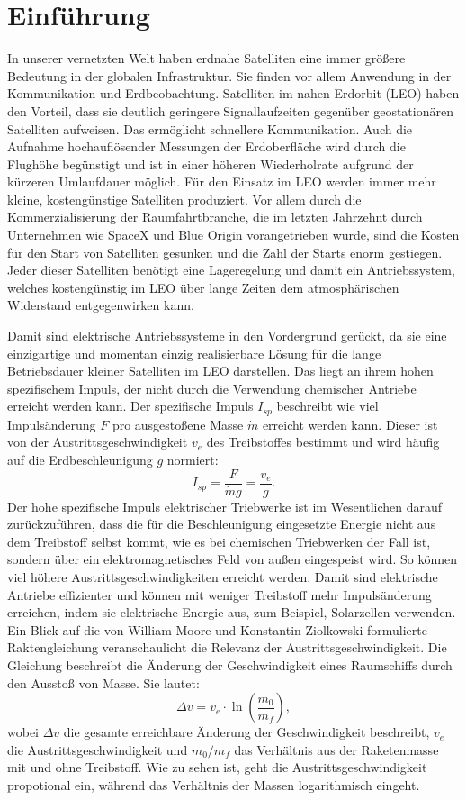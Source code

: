 \chapter{Einführung}
In unserer vernetzten Welt haben erdnahe Satelliten eine immer größere Bedeutung in der globalen Infrastruktur. Sie finden vor allem Anwendung in der Kommunikation und Erdbeobachtung. Satelliten im nahen Erdorbit (LEO) haben den Vorteil, dass sie deutlich geringere Signallaufzeiten gegenüber geostationären Satelliten aufweisen. Das ermöglicht schnellere Kommunikation. Auch die Aufnahme hochauflösender Messungen der Erdoberfläche wird durch die Flughöhe begünstigt und ist in einer höheren Wiederholrate aufgrund der kürzeren Umlaufdauer möglich. Für den Einsatz im LEO werden immer mehr kleine, kostengünstige Satelliten produziert. Vor allem durch die Kommerzialisierung der Raumfahrtbranche, die im letzten Jahrzehnt durch Unternehmen wie SpaceX und Blue Origin vorangetrieben wurde, sind die Kosten für den Start von Satelliten gesunken und die Zahl der Starts enorm gestiegen. Jeder dieser Satelliten benötigt eine Lageregelung und damit ein Antriebssystem, welches kostengünstig im LEO über lange Zeiten dem atmosphärischen Widerstand entgegenwirken kann.

Damit sind elektrische Antriebssysteme in den Vordergrund gerückt, da sie eine einzigartige und momentan einzig realisierbare Lösung für die lange Betriebsdauer kleiner Satelliten im LEO darstellen. Das liegt an ihrem hohen spezifischem Impuls, der nicht durch die Verwendung chemischer Antriebe erreicht werden kann. Der spezifische Impuls $I_{sp}$ beschreibt wie viel Impulsänderung $F$ pro ausgestoßene Masse $\dot{m}$ erreicht werden kann. Dieser ist von der Austrittsgeschwindigkeit $v_e$ des Treibstoffes bestimmt und wird häufig auf die Erdbeschleunigung $g$ normiert:
\begin{equation}
    I_{sp} = \frac{F}{\dot{m}g} = \frac{v_e}{g}.
\end{equation} 
Der hohe spezifische Impuls elektrischer Triebwerke ist im Wesentlichen darauf zurückzuführen, dass die für die Beschleunigung eingesetzte Energie nicht aus dem Treibstoff selbst kommt, wie es bei chemischen Triebwerken der Fall ist, sondern über ein elektromagnetisches Feld von außen eingespeist wird. So können viel höhere Austrittsgeschwindigkeiten erreicht werden. Damit sind elektrische Antriebe effizienter und können mit weniger Treibstoff mehr Impulsänderung erreichen, indem sie elektrische Energie aus, zum Beispiel, Solarzellen verwenden. Ein Blick auf die von William Moore und Konstantin Ziolkowski formulierte Raktengleichung veranschaulicht die Relevanz der Austrittsgeschwindigkeit. Die Gleichung beschreibt die Änderung der Geschwindigkeit eines Raumschiffs durch den Ausstoß von Masse. Sie lautet:
\begin{equation}
    \Delta v = v_e \cdot \ln\left(\frac{m_0}{m_f}\right),
\end{equation}
wobei $\Delta v$ die gesamte erreichbare Änderung der Geschwindigkeit beschreibt, $v_e$ die Austrittsgeschwindigkeit und ${m_0}/{m_f}$ das Verhältnis aus der Raketenmasse mit und ohne Treibstoff. Wie zu sehen ist, geht die Austrittsgeschwindigkeit propotional ein, während das Verhältnis der Massen logarithmisch eingeht. 

